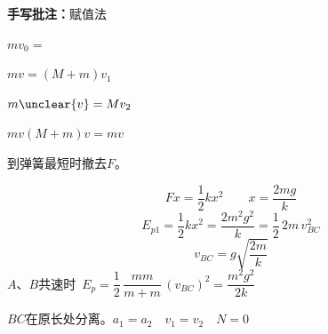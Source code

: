 \textbf{手写批注：}赋值法

$mv_0=$%

$mv=(M+m)v_1$

$m\unclear{v}=Mv_2$

\quad $mv$\quad $(M+m)v=mv$%

到弹簧最短时撤去$F$。

\[
Fx=\frac{1}{2}kx^2\qquad x=\frac{2mg}{k}
\]
\[
E_{p1}=\frac{1}{2}kx^2=\frac{2m^2g^2}{k}=\frac{1}{2}\,2m\,v_{BC}^2
\]
\[
v_{BC}=g\sqrt{\frac{2m}{k}}
\]
$A$、$B$共速时\ $E_p=\dfrac{1}{2}\,\dfrac{mm}{m+m}\,(v_{BC})^2=\dfrac{m^2g^2}{2k}$

$BC$在原长处分离。\quad $a_1=a_2\quad v_1=v_2\quad N=0$

